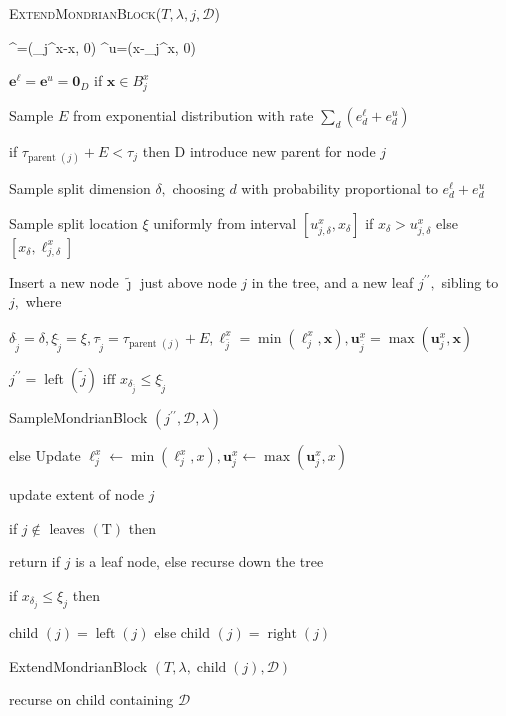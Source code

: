 {\fontsize{4}{4}\selectfont
\begin{algorithm}[h]
\caption{\textsc{ExtendMondrianBlock($T,\lambda,j,\mathcal{D}$)}}

 ^{\ell}=\max \left(\ell_{j}^{x}-x, 0\right)  ^{u}=\max \left(x-_{j}^{x}, 0\right)

$\mathbf{e}^{\ell}=\mathbf{e}^{u}=\mathbf{0}_{D}$ if $\boldsymbol{x} \in B_{j}^{x}$

Sample $E$ from exponential distribution with rate $\sum_{d}\left(e_{d}^{\ell}+e_{d}^{u}\right)$ 

if $\tau_{\text {parent }(j)}+E<\tau_{j}$ then D introduce new parent for node $j$ 

Sample split dimension $\delta,$ choosing $d$ with probability proportional to $e_{d}^{\ell}+e_{d}^{u}$ 

Sample split location $\xi$ uniformly from interval $\left[u_{j, \delta}^{x}, x_{\delta}\right]$ if $x_{\delta}>u_{j, \delta}^{x}$ else $\left[x_{\delta}, \ell_{j, \delta}^{x}\right]$

Insert a new node $\tilde{\jmath}$ just above node $j$ in the tree, and a new leaf $j^{\prime \prime},$ sibling to $j,$ where

$\delta_{\tilde{j}}=\delta, \xi_{\tilde{j}}=\xi, \tau_{\tilde{j}}=\tau_{\text {parent }(j)}+E, \ell_{\bar{j}}^{x}=\min \left(\ell_{j}^{x}, \boldsymbol{x}\right), \mathbf{u}_{\bar{j}}^{x}=\max \left(\mathbf{u}_{j}^{x}, \boldsymbol{x}\right)$

$j^{\prime \prime}=\operatorname{left}(\tilde{j}) \text { iff } x_{\delta_{\bar{j}}} \leq \xi_{\tilde{j}}$


SampleMondrianBlock $\left(j^{\prime \prime}, \mathcal{D}, \lambda\right)$ 

else 
Update $\ell_{j}^{x} \leftarrow \min \left(\ell_{j}^{x}, x\right), \mathbf{u}_{j}^{x} \leftarrow \max \left(\mathbf{u}_{j}^{x}, x\right)$

update extent of node $j$ 

if $j \notin$ leaves $(\mathrm{T})$ then

return if $j$ is a leaf node, else recurse down the tree 

if $x_{\delta_{j}} \leq \xi_{j}$ then 

child $(j)=\operatorname{left}(j)$ else child $(j)=\operatorname{right}(j)$

ExtendMondrianBlock $(T, \lambda, \operatorname{child}(j), \mathcal{D}) \quad$

recurse on child containing $\mathcal{D}$
\end{algorithm}
}




